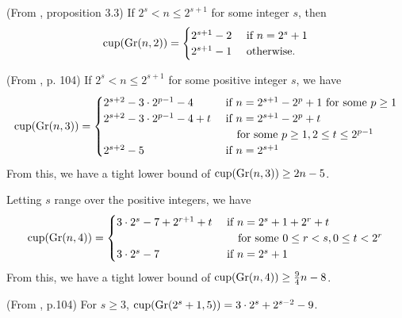 \begin{proposition}\label{prop:cup-Grn2}
    (From \cite{pavesic2021}, proposition 3.3)
    If $2^s < n \leq 2^{s+1}$ for some integer $s$, then
    \[
        \operatorname{cup}(\operatorname{Gr}(n,2))
        = \begin{cases}
            2^{s+1} - 2 &\text{ if } n = 2^s + 1 \\
            2^{s+1} - 1 &\text{ otherwise}.
        \end{cases}
    \]
\end{proposition}

\begin{proposition}\label{prop:cup-Grn3}
    (From \cite{stong1982}, p. 104)
    If $2^s < n \leq 2^{s+1}$ for some positive integer $s$, we have
    \[
        \operatorname{cup}(\operatorname{Gr}(n,3))
        = \begin{cases}
            2^{s + 2} - 3 \cdot 2^{p - 1} - 4 &\text{ if } n = 2^{s+1} - 2^{p} + 1 \text{ for some } p \geq 1 \\
            2^{s + 2} - 3 \cdot 2^{p - 1} - 4 + t &\text{ if } n = 2^{s+1} - 2^{p} + t\\
            &\quad\text{ for some } p \geq 1, 2 \leq t \leq 2^{p-1} \\
            2^{s + 2} - 5 &\text{ if } n = 2^{s+1} \\
        \end{cases}
    \]
    From this, we have a tight lower bound of $\operatorname{cup}(\operatorname{Gr}(n,3)) \geq 2n - 5$.
\end{proposition}

\begin{proposition}\label{prop:cup-Grn4}
    Letting $s$ range over the positive integers, we have
    \[
        \operatorname{cup}(\operatorname{Gr}(n,4))
        = \begin{cases}
            3 \cdot 2^s - 7 + 2^{r+1} + t &\text{ if } n = 2^s + 1 + 2^r + t \\
            &\quad\text{ for some } 0 \leq r < s, 0 \leq t < 2^r \\
            3 \cdot 2^s - 7 &\text{ if } n = 2^s + 1
        \end{cases}
    \]
    From this, we have a tight lower bound of $\operatorname{cup}(\operatorname{Gr}(n,4)) \geq \frac{9}{4} n - 8$.
\end{proposition}

\begin{proposition}\label{prop:cup-Grn5-partial}
    (From \cite{stong1982}, p.104)
    For $s \geq 3$, $\operatorname{cup}(\operatorname{Gr}(2^s+1,5)) = 3 \cdot 2^s + 2^{s-2} - 9$.
\end{proposition}

